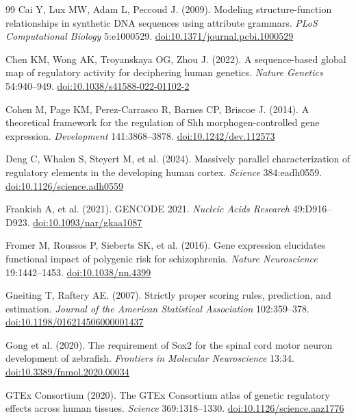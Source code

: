 \begin{thebibliography}{99}
 Cai Y, Lux MW, Adam L, Peccoud J. (2009). Modeling structure-function relationships in synthetic DNA sequences using attribute grammars. \textit{PLoS Computational Biology} 5:e1000529. \href{https://doi.org/10.1371/journal.pcbi.1000529}{doi:10.1371/journal.pcbi.1000529}

 Chen KM, Wong AK, Troyanskaya OG, Zhou J. (2022). A sequence-based global map of regulatory activity for deciphering human genetics. \textit{Nature Genetics} 54:940–949. \href{https://doi.org/10.1038/s41588-022-01102-2}{doi:10.1038/s41588-022-01102-2}

 Cohen M, Page KM, Perez-Carrasco R, Barnes CP, Briscoe J. (2014). A theoretical framework for the regulation of Shh morphogen-controlled gene expression. \textit{Development} 141:3868–3878. \href{https://doi.org/10.1242/dev.112573}{doi:10.1242/dev.112573}

 Deng C, Whalen S, Steyert M, et al. (2024). Massively parallel characterization of regulatory elements in the developing human cortex. \textit{Science} 384:eadh0559. \href{https://doi.org/10.1126/science.adh0559}{doi:10.1126/science.adh0559}

 Frankish A, et al. (2021). GENCODE 2021. \textit{Nucleic Acids Research} 49:D916–D923. \href{https://doi.org/10.1093/nar/gkaa1087}{doi:10.1093/nar/gkaa1087}

 Fromer M, Roussos P, Sieberts SK, et al. (2016). Gene expression elucidates functional impact of polygenic risk for schizophrenia. \textit{Nature Neuroscience} 19:1442–1453. \href{https://doi.org/10.1038/nn.4399}{doi:10.1038/nn.4399}

 Gneiting T, Raftery AE. (2007). Strictly proper scoring rules, prediction, and estimation. \textit{Journal of the American Statistical Association} 102:359–378. \href{https://doi.org/10.1198/016214506000001437}{doi:10.1198/016214506000001437}

 Gong et al. (2020). The requirement of Sox2 for the spinal cord motor neuron development of zebrafish. \textit{Frontiers in Molecular Neuroscience} 13:34. \href{https://doi.org/10.3389/fnmol.2020.00034}{doi:10.3389/fnmol.2020.00034}

 GTEx Consortium (2020). The GTEx Consortium atlas of genetic regulatory effects across human tissues. \textit{Science} 369:1318–1330. \href{https://doi.org/10.1126/science.aaz1776}{doi:10.1126/science.aaz1776}


\end{thebibliography}
